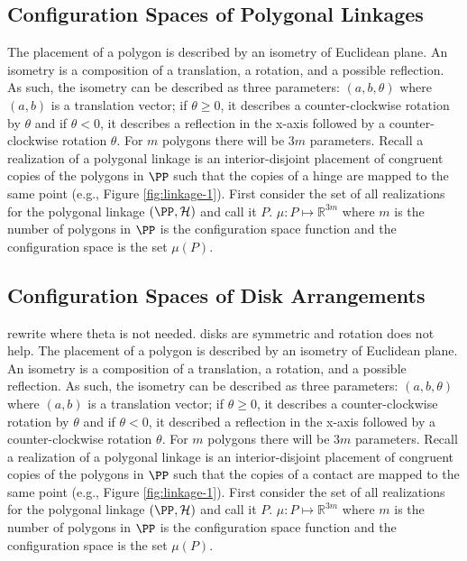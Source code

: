 \documentclass[10pt]{CSUNthesis}
\theoremstyle{plain}%
\theoremstyle{definition}
\theoremstyle{remark}
\newcommand{\HH}{{\mathcal{H}}} %
\newcommand{\bbR}{{\mathbb{R}}}
\newcommand{\lr}[1]{\left( #1 \right)}
\begin{document}
\subsection{Configuration Spaces of Polygonal Linkages}
The placement of a polygon is described by an isometry of Euclidean plane.
An isometry is a composition of a translation, a rotation, and a possible reflection.
As such, the isometry can be described as three parameters: $\lr{a,b,\theta}$ where $(a,b)$ is a translation vector; if $\theta \geq 0$, it describes a counter-clockwise rotation by $\theta$ and if $\theta < 0$, it describes a reflection in the x-axis followed by a counter-clockwise rotation $\theta$.
For $m$ polygons there will be $3 m$ parameters.
Recall a realization of a polygonal linkage is an interior-disjoint placement of congruent copies of the polygons in $\PP$ such that the copies of a hinge are mapped to the same point (e.g., Figure \ref{fig:linkage-1}).
First consider the set of all realizations for the polygonal linkage $\left(\PP,\HH\right)$ and call it $P$.  
$\mu:P \mapsto \bbR^{3m}$ where $m$ is the number of polygons in $\PP$ is the configuration space function and the configuration space is the set $\mu(P)$. 

 \subsection{Configuration Spaces of Disk Arrangements}
rewrite where theta is not needed.  disks are symmetric and rotation does not help.
The placement of a polygon is described by an isometry of Euclidean plane.
An isometry is a composition of a translation, a rotation, and a possible reflection.
As such, the isometry can be described as three parameters: $\lr{a,b,\theta}$ where $(a,b)$ is a translation vector; if $\theta \geq 0$, it describes a counter-clockwise rotation by $\theta$ and if $\theta < 0$, it described a reflection in the x-axis followed by a counter-clockwise rotation $\theta$.
For $m$ polygons there will be $3 m$ parameters.
Recall a realization of a polygonal linkage is an interior-disjoint placement of congruent copies of the polygons in $\PP$ such that the copies of a contact are mapped to the same point (e.g., Figure \ref{fig:linkage-1}).
First consider the set of all realizations for the polygonal linkage $\left(\PP,\HH\right)$ and call it $P$.  
$\mu:P \mapsto \bbR^{3m}$ where $m$ is the number of polygons in $\PP$ is the configuration space function and the configuration space is the set $\mu(P)$. 
\end{document}
